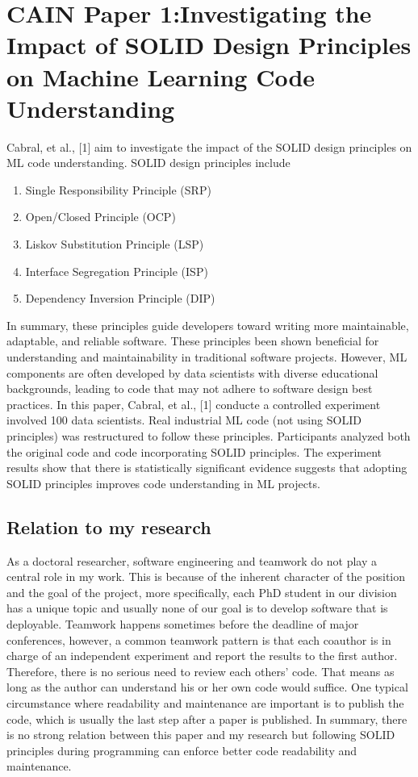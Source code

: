 \documentclass{article}
\begin{document}
\section{CAIN Paper 1:Investigating the Impact of SOLID Design Principles on Machine Learning Code Understanding }

Cabral, et al., [1] aim to investigate the impact of the SOLID design principles on ML code understanding. SOLID design principles include 
\begin{enumerate}
    \item Single Responsibility Principle (SRP)
    \item Open/Closed Principle (OCP)
    \item Liskov Substitution Principle (LSP)
    \item Interface Segregation Principle (ISP)
    \item Dependency Inversion Principle (DIP)
\end{enumerate}
In summary, these principles guide developers toward writing more maintainable, adaptable, and reliable software.
These principles been shown beneficial for understanding and maintainability in traditional software projects.
However, ML components are often developed by data scientists with diverse educational backgrounds, leading to code that may not adhere to software design best practices. 
In this paper, Cabral, et al., [1] conducte a controlled experiment involved 100 data scientists.
Real industrial ML code (not using SOLID principles) was restructured to follow these principles.
Participants analyzed both the original code and code incorporating SOLID principles.
The experiment results show that there is statistically significant evidence suggests that adopting SOLID principles improves code understanding in ML projects.

\subsection{Relation to my research}
As a doctoral researcher, software engineering and teamwork do not play a central role in my work.
This is because of the inherent character of the position and the goal of the project, more specifically, each PhD student in our division has a unique topic and usually none of our goal is to develop software that is deployable. 
Teamwork happens sometimes before the deadline of major conferences, however, a common teamwork pattern is that each coauthor is in charge of an independent experiment and report the results to the first author.
Therefore, there is no serious need to review each others' code.
That means as long as the author can understand his or her own code would suffice.
One typical circumstance where readability and maintenance are important is to publish the code, which is usually the last step after a paper is published.
In summary, there is no strong relation between this paper and my research but following SOLID principles during programming can enforce better code readability and maintenance.
\end{document}
